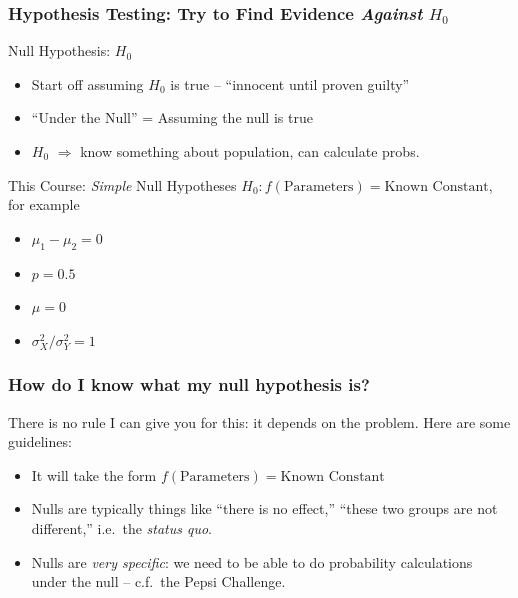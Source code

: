 \documentclass[handout]{beamer}
\begin{document}
\begin{frame}
	\frametitle{Hypothesis Testing: Try to 
	Find Evidence \emph{Against} $H_0$}
\begin{block}
	{Null Hypothesis: $H_0$}
	\begin{itemize}
		\item Start off assuming $H_0$ is true --
		 ``innocent until proven guilty''
		\item ``Under the Null'' = Assuming the null is true
		\item $H_0$ $\Rightarrow$ know something about population, can calculate probs.
	\end{itemize}
\end{block}
\begin{alertblock}
	{This Course: \emph{Simple} Null Hypotheses}
	$H_0\colon f(\mbox{Parameters}) = \mbox{Known Constant}$, for example
	\begin{itemize}
		\item $\mu_1 - \mu_2 = 0$
		\item $p = 0.5$
		\item $\mu = 0$
		\item $\sigma^2_X/\sigma^2_Y = 1$
	\end{itemize}
\end{alertblock}
\end{frame}
\begin{frame}
	\frametitle{How do I know what my null hypothesis is?}
	There is no rule I can give you for this: it depends on the problem. Here are some guidelines:
	\begin{itemize}
		\item It will take the form $f(\mbox{Parameters}) = \mbox{Known Constant}$
		\item Nulls are typically things like ``there is no effect,'' ``these two groups are not different,'' i.e.\ the \emph{status quo}. 
		\item Nulls are \emph{very specific}: we need to be able to do probability calculations under the null -- c.f.\ the Pepsi Challenge.
	\end{itemize}
\end{frame}
\end{document}
